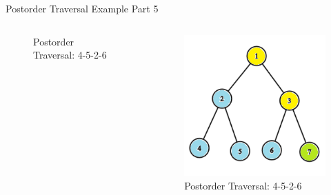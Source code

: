 \documentclass[aspectratio=169]{beamer}%
\begin{document}
\begin{frame}{Postorder Traversal Example Part 5}
\begin{columns}
\begin{column}{0.32\textwidth}
\begin{figure}
                \caption{Postorder Traversal: 4-5-2-6}
            \end{figure}
        \end{column}
        \hfill
        \begin{column}{0.32\textwidth}
            \begin{figure}
                \centering
                \includegraphics[width = .9\linewidth]{tree-post 15.png}
                \caption{Postorder Traversal: 4-5-2-6}
            \end{figure}
        \end{column}
    \end{columns}
\end{frame}
\end{document}
